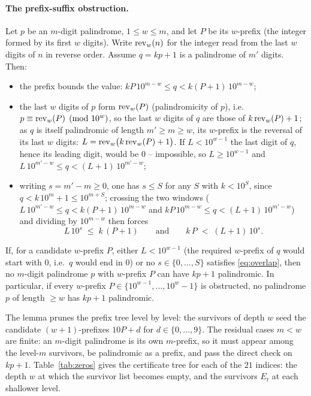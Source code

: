 \paragraph{The prefix-suffix obstruction.}
Let $p$ be an $m$-digit palindrome, $1 \le w \le m$, and
let $P$ be its $w$-prefix (the integer formed by its
first $w$ digits). Write $\mathrm{rev}_w(n)$ for the integer
read from the last $w$ digits of $n$ in reverse order.
Assume $q = kp+1$ is a palindrome of $m'$ digits. Then:
\begin{itemize}
\item the prefix bounds the value:
$kP\,10^{m-w} \le q < k(P+1)\,10^{m-w}$;
\item the last $w$ digits of $p$ form $\mathrm{rev}_w(P)$
(palindromicity of $p$), i.e.\
$p \equiv \mathrm{rev}_w(P) \pmod{10^w}$, so the last $w$
digits of $q$ are those of $k\,\mathrm{rev}_w(P) + 1$; as $q$ is
itself palindromic of length $m' \ge m \ge w$, its
$w$-prefix is the reversal of its last $w$ digits:
$L = \mathrm{rev}_w\bigl(k\,\mathrm{rev}_w(P) + 1\bigr)$. If
$L < 10^{w-1}$ the last digit of $q$, hence its leading
digit, would be $0$ -- impossible, so $L \ge 10^{w-1}$
and $L\,10^{m'-w} \le q < (L+1)\,10^{m'-w}$;
\item writing $s = m' - m \ge 0$, one has $s \le S$ for
any $S$ with $k < 10^S$, since
$q < k\,10^m + 1 \le 10^{m+S}$; crossing the two windows
($L\,10^{m'-w} \le q < k(P+1)\,10^{m-w}$ and
$kP\,10^{m-w} \le q < (L+1)\,10^{m'-w}$) and dividing by
$10^{m-w}$ then forces
\begin{equation}
 L\,10^{s} \;\le\; k\,(P+1)
 \qquad\text{and}\qquad
 k\,P \;<\; (L+1)\,10^{s} .
 \label{eq:overlap}
\end{equation}
\end{itemize}

\begin{lemma}
\label{lem:border}
If, for a candidate $w$-prefix $P$, either
$L < 10^{w-1}$ (the required $w$-prefix of $q$ would
start with $0$, i.e.\ $q$ would end in $0$) or no
$s \in \{0,\dots,S\}$ satisfies \eqref{eq:overlap},
then no $m$-digit palindrome $p$ with $w$-prefix $P$
can have $kp+1$ palindromic. In particular, if every
$w$-prefix $P \in \{10^{w-1},\dots,10^{w}-1\}$ is
obstructed, no palindrome $p$ of length $\ge w$ has
$kp+1$ palindromic.
\end{lemma}

The lemma prunes the prefix tree level by level: the
survivors of depth $w$ seed the candidate $(w+1)$-prefixes
$10P + d$ for $d \in \{0,\dots,9\}$. The residual cases
$m < w$ are finite: an $m$-digit palindrome is its own
$m$-prefix, so it must appear among the level-$m$
survivors, be palindromic as a prefix, and pass the
direct check on $kp+1$. Table~\ref{tab:zeros} gives the
certificate tree for each of the $21$ indices: the depth
$w$ at which the survivor list becomes empty, and the
survivors $E_t$ at each shallower level.

